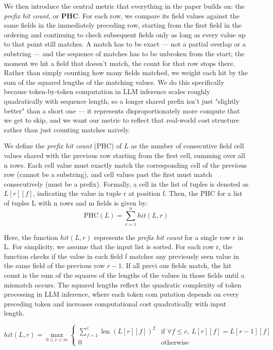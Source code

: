 \documentclass[manuscript,review]{acmart}
\begin{document}
We then introduce the central metric that everything in the paper builds on: the \textit{prefix hit count}, or \textbf{PHC}. For each row, we compare its field values against the same fields in the immediately preceding row, starting from the first field in the ordering and continuing to check subsequent fields only as long as every value up to that point still matches. A match has to be exact — not a partial overlap or a substring — and the sequence of matches has to be unbroken from the start; the moment we hit a field that doesn't match, the count for that row stops there. Rather than simply counting how many fields matched, we weight each hit by the sum of the squared lengths of the matching values. We do this specifically because token-by-token computation in LLM inference scales roughly quadratically with sequence length, so a longer shared prefix isn't just "slightly better" than a short one — it represents disproportionately more compute that we get to skip, and we want our metric to reflect that real-world cost structure rather than just counting matches naively.

We define the \textit{prefix hit count} (PHC) of $L$ as the number
of consecutive field cell values shared with the previous
row starting from the first cell, summing over all n rows.
Each cell value must exactly match the corresponding cell
of the previous row (cannot be a substring), and cell values
past the first must match consecutively (must be a prefix).
Formally, a cell in the list of tuples is denoted as $L[r][f]$,
indicating the value in tuple r at position f. Then, the PHC
for a list of tuples L with n rows and m fields is given by:
\begin{equation}
\text{PHC}(L) = \sum_{r=1}^{n} hit(L, r)
\end{equation}

Here, the function $hit(L,r)$ represents the \textit{ prefix hit count}
for a single row r in L. For simplicity, we assume that the
input list is sorted. For each row r, the function checks if
the value in each field f matches any previously seen value
in the same field of the previous row $r-1$. If all previ
ous fields match, the hit count is the sum of the squares of
the lengths of the values in those fields until a mismatch occurs. The squared lengths reflect the quadratic complexity of
token processing in LLM inference, where each token com
putation depends on every preceding token and increases
computational cost quadratically with input length.

\begin{equation}
hit(L, r) = \max_{0 \le c < m}
\begin{cases}
\displaystyle\sum_{f=1}^{c} \operatorname{len}(L[r][f])^2 & \text{if } \forall f \le c,\ L[r][f] = L[r-1][f] \\[0.6em]
0 & \text{otherwise}
\end{cases}
\end{equation}
\end{document}
